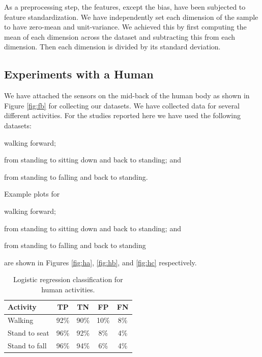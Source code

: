 \documentclass[letterpaper]{article}
\begin{document}
\begin{sloppy}
As a preprocessing step, the features, except the bias, have been subjected to feature 
standardization. We have independently set each dimension of the sample  to have zero-mean and 
unit-variance. We achieved this by first computing the mean of each dimension across the dataset and 
subtracting this from each dimension. Then each dimension is divided by its standard deviation.
 

\subsection{Experiments with a Human}

We have attached the sensors on the mid-back of the human body as shown in Figure \ref{fig:fb} for  
collecting our datasets. We have collected data for several different  activities. For the studies 
reported here we have used the following datasets:
\begin{inparaenum}[(1)] \item walking forward; \item from standing to sitting down 
and back to standing; and \item from standing to falling and back to standing. \end{inparaenum} 
Example plots for \begin{inparaenum}[1)] \item walking forward; \item from standing to sitting 
down 
and back to standing; and \item from standing to falling and back to standing \end{inparaenum} 
 are shown in Figures \ref{fig:ha}, \ref{fig:hb}, and \ref{fig:hc} respectively. 

 \begin{table}[!ht]
\caption{Logistic regression classification for human activities.}
	\label{tab:human-logistic-class}
	\centering
		\begin{tabular} {|l |c |c |c|c|}
			\hline
			{\bf Activity} & {\bf  TP}  &	{\bf TN}  &	{\bf FP} &	{\bf FN} \\ 
			\hline
			Walking	& 92\%	& 90\%	& 10\%	& 8\% \\ \hline
			Stand to seat	& 96\%	& 92\%	& 8\% & 	4\%	 \\ \hline 
			Stand to fall	& 96\%	& 94\%	& 6\%	& 4\%	 \\ \hline
		\end{tabular}
\end{table}



\end{sloppy}
\end{document}
